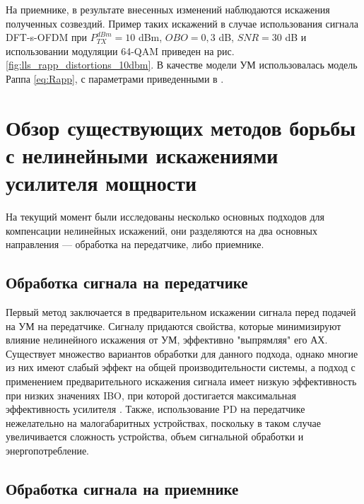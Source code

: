 \documentclass{unn}
\begin{document}
На приемнике, в результате внесенных изменений наблюдаются искажения
полученных созвездий. Пример таких искажений в случае
использования сигнала DFT-s-OFDM при $P^{dBm}_{TX} = 10$ dBm, $OBO = 0,3$
dB, $SNR=30$ dB и использовании модуляции 64-QAM приведен на рис.
\ref{fig:lls_rapp_distortions_10dbm}. В качестве модели УМ использовалась
модель Раппа \ref{eq:Rapp}, с параметрами приведенными в \cite{nokia163314}.


\section{Обзор существующих методов борьбы с нелинейными искажениями усилителя мощности}
На текущий момент были исследованы несколько основных подходов для
компенсации нелинейных искажений, они разделяются на два основных
направления — обработка на передатчике, либо приемнике.

\subsection{Обработка сигнала на передатчике}

Первый метод заключается в предварительном искажении сигнала перед
подачей на УМ на передатчике. Сигналу придаются свойства, которые
минимизируют влияние нелинейного искажения от УМ, эффективно "выпрямляя"
его АХ. Существует множество вариантов обработки для данного подхода,
однако многие из них имеют слабый эффект на общей производительности
системы, а подход с применением предварительного искажения сигнала имеет
низкую эффективность при низких значениях IBO, при которой достигается
максимальная эффективность усилителя \cite{sharath2015}
\cite{shabany2008} \cite{eda2001}. Также, использование PD на передатчике
нежелательно на малогабаритных устройствах, поскольку в таком случае
увеличивается сложность устройства, объем сигнальной обработки и энергопотребление.

\subsection{Обработка сигнала на приемнике}
\end{document}

